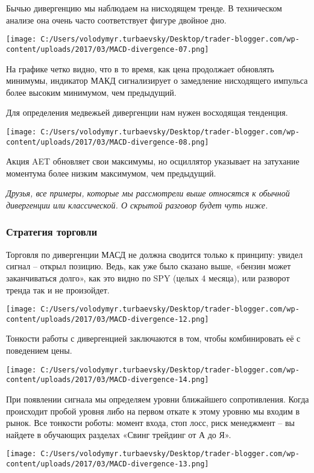 \documentclass[a5paper]{article}
\begin{document}
Бычью дивергенцию мы наблюдаем на нисходящем тренде. В техническом анализе она очень часто соответствует фигуре двойное дно.

\texttt{[image: C:/Users/volodymyr.turbaevsky/Desktop/trader-blogger.com/wp-content/uploads/2017/03/MACD-divergence-07.png]}

На графике четко видно, что в то время, как цена продолжает обновлять минимумы, индикатор МАКД сигнализирует о замедление нисходящего импульса более высоким минимумом, чем предыдущий.

Для определения медвежьей дивергенции нам нужен восходящая тенденция.

\texttt{[image: C:/Users/volodymyr.turbaevsky/Desktop/trader-blogger.com/wp-content/uploads/2017/03/MACD-divergence-08.png]}

Акция AET обновляет свои максимумы, но осциллятор указывает на затухание моментума более низким максимумом, чем предыдущий.

    \emph{Друзья, все примеры, которые мы рассмотрели выше относятся к обычной дивергенции или классической. О скрытой разговор будет чуть ниже.}

\subsubsection{Стратегия торговли}

Торговля по дивергенции МАСД не должна сводится только к принципу: увидел сигнал – открыл позицию. Ведь, как уже было сказано выше, «бензин может заканчиваться долго», как это видно по SPY (целых 4 месяца), или разворот тренда так и не произойдет.

\texttt{[image: C:/Users/volodymyr.turbaevsky/Desktop/trader-blogger.com/wp-content/uploads/2017/03/MACD-divergence-12.png]}

Тонкости работы с дивергенцией заключаются в том, чтобы комбинировать её с поведением цены.

\texttt{[image: C:/Users/volodymyr.turbaevsky/Desktop/trader-blogger.com/wp-content/uploads/2017/03/MACD-divergence-14.png]}

При появлении сигнала мы определяем уровни ближайшего сопротивления. Когда происходит пробой уровня либо на первом откате к этому уровню мы входим в рынок. Все тонкости роботы: момент входа, стоп лосс, риск менеджмент – вы найдете в обучающих разделах «Свинг трейдинг от А до Я».

\texttt{[image: C:/Users/volodymyr.turbaevsky/Desktop/trader-blogger.com/wp-content/uploads/2017/03/MACD-divergence-13.png]}
\end{document}
